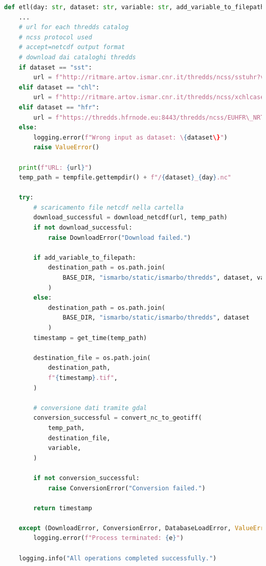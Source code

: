 \documentclass[./main.tex]{subfiles}
\begin{document}
\begin{lstlisting}[language=Python, 
    caption={Procedura utilizzata per scaricare e convertire i dati dei cataloghi thredds.},
    label=lst:etl_urls]
    def etl(day: str, dataset: str, variable: str, add_variable_to_filepath: bool = False):
    ...
    # url for each thredds catalog
    # ncss protocol used
    # accept=netcdf output format
    # download dai cataloghi thredds
    if dataset == "sst":
        url = f"http://ritmare.artov.ismar.cnr.it/thredds/ncss/sstuhr?var=\{variable\}\&disableLLSubset=on\&disableProjSubset=on\&horizStride=1\&time=\{day\}\&addLatLon=true\&accept=netcdf"
    elif dataset == "chl":
        url = f"http://ritmare.artov.ismar.cnr.it/thredds/ncss/xchlcase12?var=\{variable\}\&disableLLSubset=on\&disableProjSubset=on\&horizStride=1\&time=\{day\}\&addLatLon=true\&accept=netcdf"
    elif dataset == "hfr":
        url = f"https://thredds.hfrnode.eu:8443/thredds/ncss/EUHFR\_NRTcurrent\_HFR-TirLig-Total\_v3?var=\{variable\}\&north=44.4960\&west=7.5069\&east=10.4930\&south=43.2539\&disableLLSubset=on\&disableProjSubset=on\&horizStride=1\&time=\{day\}\&vertCoord=0"
    else:
        logging.error(f"Wrong input as dataset: \{dataset\}")
        raise ValueError()   

    print(f"URL: {url}")
    temp_path = tempfile.gettempdir() + f"/{dataset}_{day}.nc"

    try:
        # scaricamento file netcdf nella cartella
        download_successful = download_netcdf(url, temp_path)
        if not download_successful:
            raise DownloadError("Download failed.")

        if add_variable_to_filepath:
            destination_path = os.path.join(
                BASE_DIR, "ismarbo/static/ismarbo/thredds", dataset, variable
            )
        else:
            destination_path = os.path.join(
                BASE_DIR, "ismarbo/static/ismarbo/thredds", dataset
            )
        timestamp = get_time(temp_path)

        destination_file = os.path.join(
            destination_path,
            f"{timestamp}.tif",
        )

        # conversione dati tramite gdal
        conversion_successful = convert_nc_to_geotiff(
            temp_path,
            destination_file,
            variable,
        )

        if not conversion_successful:
            raise ConversionError("Conversion failed.")

        return timestamp

    except (DownloadError, ConversionError, DatabaseLoadError, ValueError) as e:
        logging.error(f"Process terminated: {e}")

    logging.info("All operations completed successfully.")
\end{lstlisting}
\end{document}
